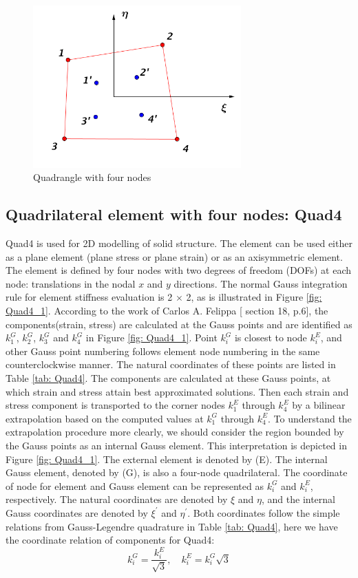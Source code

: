 \begin{figure}[h]
	\begin{center}
		\includegraphics[width=8cm,clip]{DirectCalculation.pdf}			
		\caption{Quadrangle with four nodes}	\label{fig: DirectCalculation}
	\end{center} 
\end{figure}

\subsection{Quadrilateral element with four nodes: Quad4} \label{Quad4}
Quad4 is used for 2D modelling of solid structure. The element can be used either as a plane element (plane stress or plane strain) or as an axisymmetric element. The element is defined by four nodes with two degrees of freedom (DOFs) at each node: translations in the nodal $x$ and $y$ directions. The normal Gauss integration rule for element stiffness evaluation is 2 $\times$ 2, as is illustrated in Figure \ref{fig: Quad4_1}. According to the work of Carlos A. Felippa [\cite{Felippa} section 18, p.6], the components(strain, stress) are calculated at the Gauss points and are identified as $k_1^G$, $k_2^G$, $k_3^G$ and $k_4^G$ in Figure \ref{fig: Quad4_1}. Point $k_i^G$ is closest to node $k_i^E$, and other Gauss point numbering follows element node numbering in the same counterclockwise manner. The natural coordinates of these points are listed in Table \ref{tab: Quad4}. The components are calculated at these Gauss points, at which strain and stress attain best approximated solutions. Then each strain and stress component is transported to the corner nodes $k_1^E$ through $k_4^E$ by a bilinear extrapolation based on the computed values at $k_1^G$ through $k_4^E$. To understand the extrapolation procedure more clearly, we should consider the region bounded by the Gauss points as an internal Gauss element. This interpretation is depicted in Figure \ref{fig: Quad4_1}. The external element is denoted by (E). The internal Gauss element, denoted by (G), is also a four-node quadrilateral. The coordinate of node for element and Gauss element can be represented as $k_i^G$ and $k_i^E$, respectively. The natural coordinates are denoted by $\xi$ and $\eta$, and the internal Gauss coordinates are denoted by $\xi^{\prime}$ and $\eta^{\prime}$.  Both coordinates follow the simple relations from Gauss-Legendre quadrature in Table \ref{tab: Quad4}, here we have the coordinate relation of components for Quad4:
\begin{equation}
k_i^G = \frac{k_i^E}{\sqrt{3}},\quad
k_i^E= k_i^G\sqrt{3}
\end{equation}


